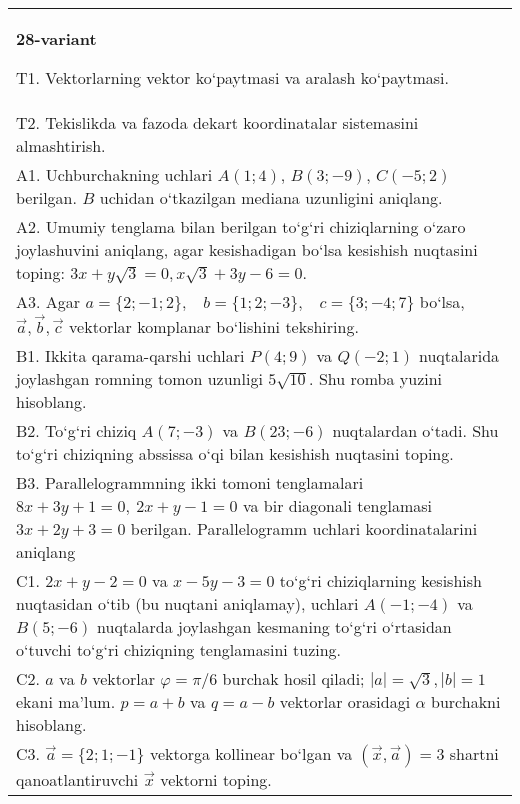 \documentclass{article}
\begin{document}
\begin{tabular}{m{17cm}}
\textbf{28-variant}

T1. 
Vektorlarning vektor ko‘paytmasi va aralash ko‘paytmasi.
 \\
T2. 
Tekislikda va fazoda dekart koordinatalar sistemasini almashtirish.
 \\
A1. 
Uchburchakning uchlari $A (1;4) $, $B (3;-9) $, $C (-5;2) $
berilgan. $B$ uchidan o‘tkazilgan mediana uzunligini aniqlang.
 \\
A2. 
Umumiy tenglama bilan berilgan to‘g‘ri chiziqlarning
o‘zaro joylashuvini aniqlang, agar kesishadigan bo‘lsa kesishish nuqtasini
toping: $3x+y\sqrt{3}=0, x\sqrt{3}+3y-6=0$.
 \\
A3. 
Agar \(a = \{ 2; - 1;2\}, \ \ \ \ b = \{ 1;2; - 3\}, \ \ \ \ c = \{ 3; - 4;7\}\) bo‘lsa, $\overrightarrow{a}, \overrightarrow{b}, \overrightarrow{c}$ vektorlar komplanar bo‘lishini tekshiring.
 \\
B1. 
Ikkita qarama-qarshi uchlari \(P (4;9) \) va \(Q (-2; 1) \) nuqtalarida joylashgan romning tomon uzunligi \(5\sqrt{10}\). Shu
romba yuzini hisoblang.
 \\
B2. 
To‘g‘ri chiziq \(A (7;-3) \) va \(B (23;-6) \) nuqtalardan o‘tadi.
Shu to‘g‘ri chiziqning abssissa o‘qi bilan kesishish nuqtasini toping.
 \\
B3. 
Parallelogrammning ikki tomoni tenglamalari
\(8x+3y+1=0,\ 2x+y-1=0\) va bir diagonali tenglamasi
\(3x+2y+3=0\) berilgan. Parallelogramm uchlari koordinatalarini
aniqlang
 \\
C1. 
\(2x+y-2=0\) va \(x-5y-3=0\)
to‘g‘ri chiziqlarning kesishish nuqtasidan o‘tib (bu nuqtani aniqlamay), uchlari
\(A (-1;-4) \) va \(B (5;-6) \) nuqtalarda joylashgan kesmaning
to‘g‘ri o‘rtasidan o‘tuvchi to‘g‘ri chiziqning tenglamasini tuzing.
 \\
C2. 
$a$ va $b$ vektorlar $\varphi = \pi/6$ burchak hosil qiladi; $|a| = \sqrt{3},|b| = 1$ ekani ma’lum. $p = a + b$ va $q = a - b$ vektorlar orasidagi $\alpha$ burchakni hisoblang.
 \\
C3. 
$\vec{a} = \{ 2;1; - 1\}$ vektorga kollinear bo‘lgan va $\left(\vec{x},\vec{a} \right) = 3$ shartni qanoatlantiruvchi $\vec{x}$ vektorni toping.
 \\

\end{tabular}
\vspace{1cm}
\end{document}
